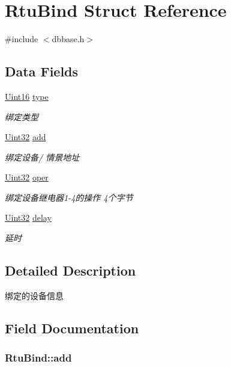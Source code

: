 \hypertarget{structRtuBind}{\section{Rtu\-Bind Struct Reference}
\label{structRtuBind}
}


{\ttfamily \#include $<$dbbase.\-h$>$}

\subsection*{Data Fields}
\begin{DoxyCompactItemize}
\item 
\hyperlink{base_8h_ae9f2e1f80fbd243687a04febbf590e13}{Uint16} \hyperlink{structRtuBind_ab9f60247ea34410bf323084c15435d65}{type}
\begin{DoxyCompactList}\small\item\em 绑定类型 \end{DoxyCompactList}\item 
\hyperlink{base_8h_a60cf7b3c038ce37a50796e8eaddf0b5f}{Uint32} \hyperlink{structRtuBind_a68a5063b5ae740267f3d8d72f1400c6e}{add}
\begin{DoxyCompactList}\small\item\em 绑定设备/ 情景地址 \end{DoxyCompactList}\item 
\hyperlink{base_8h_a60cf7b3c038ce37a50796e8eaddf0b5f}{Uint32} \hyperlink{structRtuBind_ac466a6951df3423d75ab25ce3accede3}{oper}
\begin{DoxyCompactList}\small\item\em 绑定设备继电器1-\/4的操作 4个字节 \end{DoxyCompactList}\item 
\hyperlink{base_8h_a60cf7b3c038ce37a50796e8eaddf0b5f}{Uint32} \hyperlink{structRtuBind_aa231213efdd49f97effe6b5dc9f4a243}{delay}
\begin{DoxyCompactList}\small\item\em 延时 \end{DoxyCompactList}\end{DoxyCompactItemize}


\subsection{Detailed Description}
绑定的设备信息 

\subsection{Field Documentation}
\hypertarget{structRtuBind_a68a5063b5ae740267f3d8d72f1400c6e}{
\subsubsection[{add}]{ Rtu\-Bind\-::add}}\label{structRtuBind_a68a5063b5ae740267f3d8d72f1400c6e}


